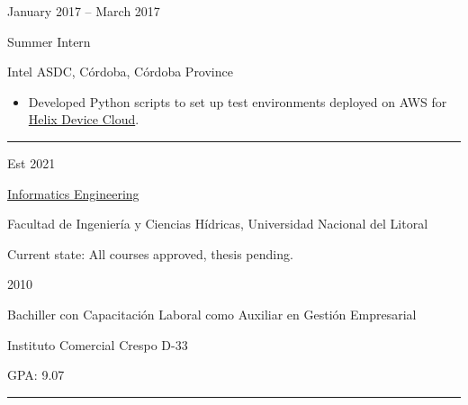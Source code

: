 \documentclass[a4paper,10pt]{article}
\newlength{\cvcolumngapwidth}
\newlength{\cvleftcolumnwidth}
\newlength{\cvrightcolumnwidth}
\newcommand{\cvsectionstyle}[1]{{\normalsize\cvsectionfont\textcolor{cvsectioncolor}{#1}}}
\newcommand{\cvtitlestyle}[1]{{\large\cvtitlefont\textcolor{cvtitlecolor}{#1}}}
\newcommand{\cvdurationstyle}[1]{{\small\cvdurationfont\textcolor{cvdurationcolor}{#1}}}
\newlength{\cvafteritemskipamount}
\newlength{\cvaftersectionskipamount}
\newlength{\cvaftertitleskipamount}
\newlength{\cvparskip}
\newcommand{\cvsection}[1]{
    \begin{minipage}[t]{\cvleftcolumnwidth}
        \raggedleft\cvsectionstyle{#1}
    \end{minipage}%
    \hspace{\cvcolumngapwidth}%
    \begin{minipage}[t]{\cvrightcolumnwidth}
        \textcolor{cvrulecolor}{\rule{\cvrightcolumnwidth}{0.3mm}}
    \end{minipage}

    \vspace{\cvaftersectionskipamount}
}
\newcommand{\cvitem}[2]{
    \begin{minipage}[t]{\cvleftcolumnwidth}
        \raggedleft #1
    \end{minipage}%
    \hspace{\cvcolumngapwidth}%
    \begin{minipage}[t]{\cvrightcolumnwidth}
        \setlength{\parskip}{\cvparskip} #2
    \end{minipage}

    \vspace{\cvafteritemskipamount}
}
\newcommand{\cvtitle}[1]{
    \cvtitlestyle{#1}

    \vspace{\cvaftertitleskipamount}
    \vspace{-\cvparskip}
}
\begin{document}
\cvitem{
    \cvdurationstyle{January 2017 -- March 2017}
}{
    \cvtitle{Summer Intern}

    Intel ASDC, Córdoba, Córdoba Province

    \begin{itemize}[leftmargin=*]
        \item Developed Python scripts to set up test environments deployed on AWS for \href{https://software.intel.com/content/www/us/en/develop/documentation/hdc-getting-started/top.html}{Helix Device Cloud}.
    \end{itemize}
}



\cvsection{EDUCATION}

\cvitem{
    \cvdurationstyle{Est 2021}
}{
    \cvtitle{\href{http://fich.unl.edu.ar/planificaciones/carrera.php?id=3}{Informatics Engineering}}

    Facultad de Ingeniería y Ciencias Hídricas, Universidad Nacional del Litoral
    
    Current state: All courses approved, thesis pending.

}

\cvitem{
    \cvdurationstyle{2010}
}{
    \cvtitle{Bachiller con Capacitación Laboral como Auxiliar en Gestión \newline Empresarial}

    Instituto Comercial Crespo D-33
    
    GPA: 9.07
    
}


\cvsection{COURSES \& CONFERENCES}
\end{document}
